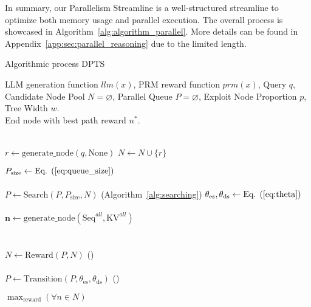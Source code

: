 In summary, our Parallelism Streamline is a well-structured streamline to optimize both memory usage and parallel execution. 
The overall process is showcased in Algorithm~\ref{alg:algorithm_parallel}. More details can be found in Appendix~\ref{app:sec:parallel_reasoning} due to the limited length. 


\begin{algorithm}[ht]
\caption{Algorithmic process DPTS}
\label{alg:algorithm_parallel}
\begin{algorithmic}[1]
\REQUIRE LLM generation function $llm(x)$, PRM reward function $prm(x)$, Query $q$, Candidate Node Pool $N = \varnothing$, Parallel Queue $P = \varnothing$, Exploit Node Proportion $p$, Tree Width $w$. \\
\ENSURE End node with best path reward $n^*$.

{\color{ForestGreen}{// Step 1: Initialize the root node}} \\
\STATE $r \gets \text{generate\_node}(q, \mathrm{None})$
\STATE $N \gets N \cup \{r\}$


    \STATE $ P_\text{size} \gets \text{Eq. (\ref{eq:queue_size})}$  \\
    
    {\color{ForestGreen}{// Step 2: Perform searching}} \\
    \STATE $P \gets \text{Search}(P, P_\text{size}, N)$ (Algorithm~\ref{alg:searching})
    \STATE $\theta_{\mathrm{es}}, \theta_{\mathrm{ds}} \gets \text{Eq. (\ref{eq:theta})}$ \\
    
    {} \\
    \STATE $\mathbf{n} \gets \text{generate\_node}(
    \mathrm{Seq}^{all}, \mathrm{KV}^{all})$ \\ 
    {} \\
    {\color{ForestGreen}{// Step 5: Terminate and reward}} \\
    \STATE $N\gets \text{Reward}(P, N)$ () \\
    {\color{ForestGreen}{// Step 6: Perform transition}} \\
    
    \STATE $P \gets \text{Transition}(P, \theta_{\mathrm{es}}, \theta_{\mathrm{ds}})$ ()
\ENDWHILE

\RETURN $\max_{\text{reward}}(\forall n \in N)$
\end{algorithmic}
\end{algorithm}

